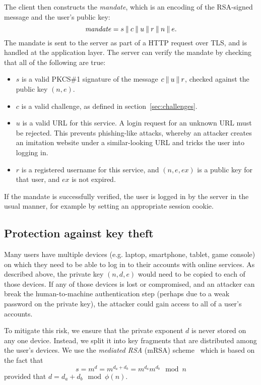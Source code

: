 The client then constructs the \emph{mandate}, which is an encoding of the RSA-signed message and
the user's public key: $$\mathit{mandate} = s \mathbin{\|} c \mathbin{\|} u \mathbin{\|} r \mathbin{\|} n \mathbin{\|} e.$$
The mandate is sent to the server as part of a HTTP request over TLS, and is handled at the
application layer. The server can verify the mandate by checking that all of the following are true:
\begin{itemize}
\item $s$ is a valid PKCS\#1 signature of the message $c \mathbin{\|} u \mathbin{\|} r$, checked against the
public key $(n, e)$.
\item $c$ is a valid challenge, as defined in section~\ref{sec:challenges}.
\item $u$ is a valid URL for this service. A login request for an unknown URL must be rejected.
This prevents phishing-like attacks, whereby an attacker creates an imitation website under a
similar-looking URL and tricks the user into logging in.
\item $r$ is a registered username for this service, and $(n, e, \mathit{ex})$ is a public key for
that user, and $\mathit{ex}$ is not expired.
\end{itemize}
If the mandate is successfully verified, the user is logged in by the server in the usual manner,
for example by setting an appropriate session cookie.

\subsection{Protection against key theft}\label{sec:revocation}

Many users have multiple devices (e.g. laptop, smartphone, tablet, game console) on which they need
to be able to log in to their accounts with online services. As described above, the private key
$(n, d, e)$ would need to be copied to each of those devices. If any of those devices is lost or
compromised, and an attacker can break the human-to-machine authentication step (perhaps due to a
weak password on the private key), the attacker could gain access to all of a user's accounts.

To mitigate this risk, we ensure that the private exponent $d$ is never stored on any one device.
Instead, we split it into key fragments that are distributed among the user's devices. We use the
\emph{mediated RSA} (mRSA) scheme~\cite{Boneh01, Kutyiowski12} which is based on the fact that
$$s = m^d = m^{d_a + d_b} = m^{d_a} m^{d_b} \mod n$$ provided that $d = d_a + d_b \mod \phi(n)$.

